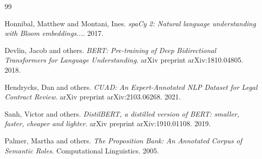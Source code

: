 \documentclass[12pt, a4paper]{article}
\begin{document}
\pagebreak
\tableofcontents
\pagebreak

\pagebreak
\pagebreak

\begin{thebibliography}{99}

Honnibal, Matthew and Montani, Ines. \textit{spaCy 2: Natural language understanding with Bloom embeddings...}. 2017.

Devlin, Jacob and others. \textit{BERT: Pre-training of Deep Bidirectional Transformers for Language Understanding}. arXiv preprint arXiv:1810.04805. 2018.

Hendrycks, Dan and others. \textit{CUAD: An Expert-Annotated NLP Dataset for Legal Contract Review}. arXiv preprint arXiv:2103.06268. 2021.

Sanh, Victor and others. \textit{DistilBERT, a distilled version of BERT: smaller, faster, cheaper and lighter}. arXiv preprint arXiv:1910.01108. 2019.

Palmer, Martha and others. \textit{The Proposition Bank: An Annotated Corpus of Semantic Roles}. Computational Linguistics. 2005.

\end{thebibliography}

\pagebreak
\nocite{*}
\end{document}
